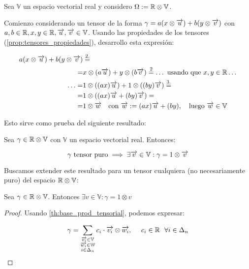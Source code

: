\begin{ejemplo}
    Sea $\mathbb{V}$ un espacio vectorial real y considero $\Omega := \mathbb{R} \otimes \mathbb{V}$.

    Comienzo considerando un tensor de la forma $\gamma = a(x \otimes \overrightarrow{u}) + b(y \otimes \overrightarrow{v})$ con $a, b \in \mathbb{R}, x, y \in \mathbb{R}, \overrightarrow{u}, \overrightarrow{v} \in \mathbb{V}$. Usando las propiedades de los tensores (\ref{prop:tensores_propiedades}), desarrollo esta expresión:

    \begin{equation}
    \begin{split}
        a(x \otimes \overrightarrow{u}) + b(y \otimes \overrightarrow{v}) &\stackrel{\text{2.}}{=} \\
        = & x \otimes (a\overrightarrow{u}) + y \otimes (b\overrightarrow{v}) \stackrel{\text{2}}{=} \ldots \text{ usando que }  x,y \in \mathbb{R} \ldots \\
        \ldots = & 1 \otimes ((ax) \overrightarrow{u}) + 1 \otimes ((by) \overrightarrow{v}) \stackrel{\text{3.}}{=} \\
        = & 1 \otimes ((ax)\overrightarrow{u} + (by) \overrightarrow{v}) = \\
        = & 1 \otimes \overrightarrow{w} \quad \text{con } \overrightarrow{w} := (ax)\overrightarrow{u} + (by), \quad \text{luego }\overrightarrow{w} \in \mathbb{V}
    \end{split}
    \end{equation}

    Esto sirve como prueba del siguiente resultado:

    \begin{proposicion}
        Sea $\gamma \in \mathbb{R} \otimes \mathbb{V}$ con $\mathbb{V}$ un espacio vectorial real. Entonces:

        \begin{equation}
            \gamma \text{ tensor puro} \implies \exists \overrightarrow{v} \in \mathbb{V}: \gamma = 1 \otimes \overrightarrow{v}
        \end{equation}
    \end{proposicion}

    Buscamos extender este resultado para un tensor cualquiera (no necesariamente puro) del espacio $\mathbb{R} \otimes \mathbb{V}$:

    \begin{proposicion}
        Sea $\gamma \in \mathbb{R} \otimes \mathbb{V}$. Entonces $\exists v \in \mathbb{V}: \gamma = 1 \otimes v$
    \end{proposicion}
    \begin{proof}
        Usando \ref{th:base_prod_tensorial}, podemos expresar:

        \begin{equation}
            \gamma = \sum_{\substack{\overrightarrow{v_i} \in \mathbb{V}\\ \overrightarrow{w_i} \in \mathbb{W}\\ i \in \Delta_{n}}} c_{i} \cdot \overrightarrow{v_i} \otimes \overrightarrow{w_i}, \ \ \ \  c_{i} \in \mathbb{R} \ \  \forall i \in \Delta_{n}
        \end{equation}


\end{proof}
\end{ejemplo}
